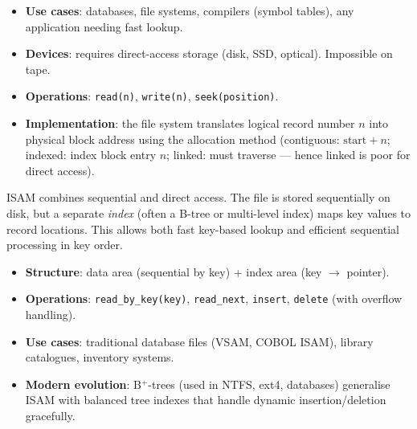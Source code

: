 \documentclass[11pt]{article}
\newcommand{\cle}[1]{{\popxbold\color{popdark}#1}}
\begin{document}
\begin{itemize}
\item \textbf{Use cases}: databases, file systems, compilers (symbol tables), any application needing fast lookup.
\item \textbf{Devices}: requires direct-access storage (disk, SSD, optical). Impossible on tape.
\item \textbf{Operations}: \texttt{read(n)}, \texttt{write(n)}, \texttt{seek(position)}.
\item \textbf{Implementation}: the file system translates logical record number $n$ into physical block address using the allocation method (contiguous: $\text{start}+n$; indexed: index block entry $n$; linked: must traverse — hence linked is poor for direct access).
\end{itemize}

\begin{definition}
\cle{ISAM} combines sequential and direct access. The file is stored sequentially on disk, but a separate \emph{index} (often a B-tree or multi-level index) maps key values to record locations. This allows both fast key-based lookup and efficient sequential processing in key order.
\end{definition}

\begin{itemize}
\item \textbf{Structure}: data area (sequential by key) + index area (key $\to$ pointer).
\item \textbf{Operations}: \texttt{read\_by\_key(key)}, \texttt{read\_next}, \texttt{insert}, \texttt{delete} (with overflow handling).
\item \textbf{Use cases}: traditional database files (VSAM, COBOL ISAM), library catalogues, inventory systems.
\item \textbf{Modern evolution}: B$^+$-trees (used in NTFS, ext4, databases) generalise ISAM with balanced tree indexes that handle dynamic insertion/deletion gracefully.
\end{itemize}
\end{document}
